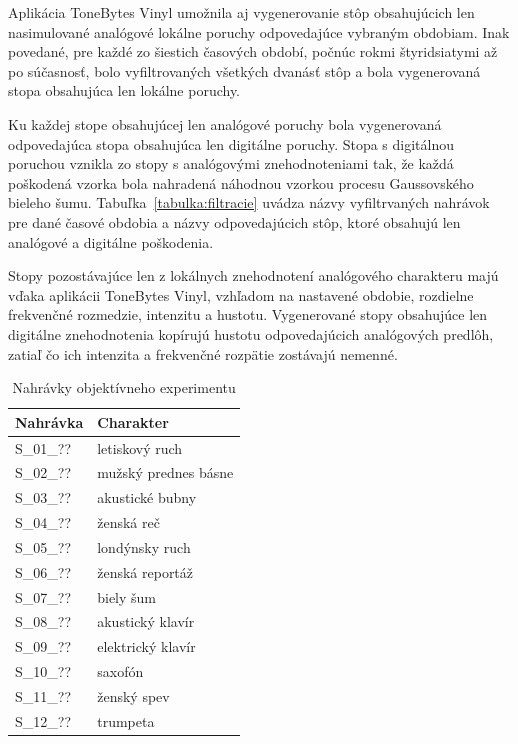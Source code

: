Aplikácia ToneBytes Vinyl umožnila aj vygenerovanie stôp obsahujúcich len nasimulované analógové lokálne poruchy odpovedajúce vybraným obdobiam. Inak povedané, pre každé zo šiestich časových období, počnúc rokmi štyridsiatymi až po súčasnosť, bolo vyfiltrovaných všetkých dvanásť stôp a bola vygenerovaná stopa obsahujúca len lokálne poruchy. 

Ku každej stope obsahujúcej len analógové poruchy bola vygenerovaná odpovedajúca stopa obsahujúca len digitálne poruchy. Stopa s digitálnou poruchou vznikla zo stopy s analógovými znehodnoteniami tak, že každá poškodená vzorka bola nahradená náhodnou vzorkou procesu Gaussovského bieleho šumu. Tabuľka~\ref{tabulka:filtracie} uvádza názvy vyfiltrvaných nahrávok pre dané časové obdobia a názvy odpovedajúcich stôp, ktoré obsahujú len analógové a digitálne poškodenia.

Stopy pozostávajúce len z lokálnych znehodnotení analógového charakteru majú vďaka aplikácii ToneBytes Vinyl, vzhľadom na nastavené obdobie, rozdielne frekvenčné rozmedzie, intenzitu a hustotu. Vygenerované stopy obsahujúce len digitálne znehodnotenia kopírujú hustotu odpovedajúcich analógových predlôh, zatiaľ čo ich intenzita a frekvenčné rozpätie zostávajú nemenné. 

\begin{table}[!h]
\centering
\caption{Nahrávky objektívneho experimentu}
\begin{tabular}{l l}
\hline
Nahrávka & Charakter\\
\hline
S\_01\_?? & letiskový ruch\\
S\_02\_?? & mužský prednes básne\\
S\_03\_?? & akustické bubny\\
S\_04\_?? & ženská reč\\
S\_05\_?? & londýnsky ruch\\
S\_06\_?? & ženská reportáž\\
S\_07\_?? & biely šum\\
S\_08\_?? & akustický klavír\\
S\_09\_?? & elektrický klavír\\
S\_10\_?? & saxofón\\
S\_11\_?? & ženský spev\\
S\_12\_?? & trumpeta\\
\hline
\end{tabular}
\label{tabulka:nahravky}
\end{table}

